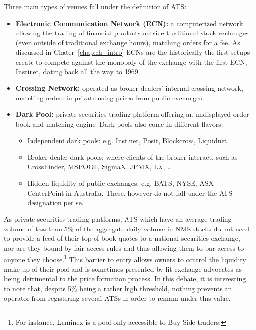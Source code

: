 Three main types of venues fall under the definition of ATS:

\begin{itemize}
\item{\textbf{Electronic Communication Network (ECN):}} a computerized network allowing the trading of financial products outside traditional stock exchanges (even outside of traditional exchange hours), matching orders for a fee. As discussed in Chater~\ref{chap:ch_intro} ECNs are the historically the first setups create to compete against the monopoly of the exchange with the first ECN, Instinet, dating back all the way to 1969. 

\item{\textbf{Crossing Network:}} operated as broker-dealers' internal crossing network, matching orders in private using prices from public exchanges.

\item{\textbf{Dark Pool:}} \label{in:dark} private securities trading platform offering an undisplayed order book and matching engine. Dark pools also come in different flavors:
        \begin{itemize}
        \item{Independent dark pools:} e.g. Instinet, Posit, Blockcross, Liquidnet 
        \item{Broker-dealer dark pools:} where clients of the broker interact, such as  CrossFinder, MSPOOL, SigmaX, JPMX, LX, \dots
        \item{Hidden liquidity of public exchanges:} e.g. BATS, NYSE, ASX CenterPoint in Australia. These, however do not fall under the ATS designation per se.
        \end{itemize}
\end{itemize}


As private securities trading platforms, ATS which have an average trading volume of less than 5\% of the aggregate daily volume in NMS stocks do not need to provide a feed of their top-of-book quotes to a national securities exchange, nor are they bound by fair access rules and thus allowing them to bar access to anyone they choose.\footnote{For instance, Luminex is a pool only accessible to Buy Side traders.} This barrier to entry allows owners to control the liquidity make up of their pool and is sometimes presented by lit exchange advocates as being detrimental to the price formation process. In this debate, it is interesting to note that, despite 5\% being a rather high threshold, nothing prevents an operator from registering several ATSs in order to remain under this value.


